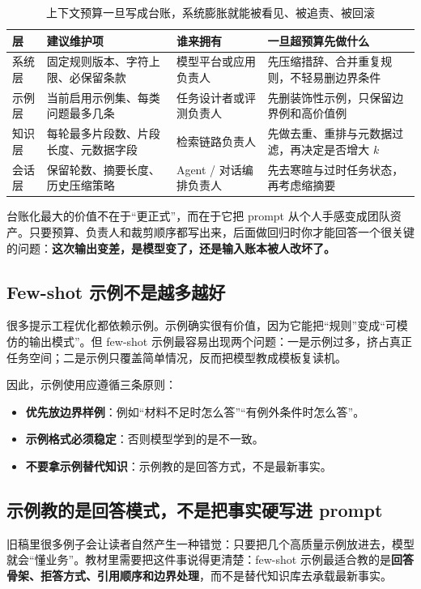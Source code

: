 \begin{table}[H]
\centering
\small
\begin{tabularx}{\textwidth}{>{\raggedright\arraybackslash}p{2.6cm}>{\raggedright\arraybackslash}p{2.5cm}>{\raggedright\arraybackslash}p{2.8cm}>{\raggedright\arraybackslash}X}
\toprule
\textbf{层} & \textbf{建议维护项} & \textbf{谁来拥有} & \textbf{一旦超预算先做什么} \\
\midrule
系统层 & 固定规则版本、字符上限、必保留条款 & 模型平台或应用负责人 & 先压缩措辞、合并重复规则，不轻易删边界条件 \\
示例层 & 当前启用示例集、每类问题最多几条 & 任务设计者或评测负责人 & 先删装饰性示例，只保留边界例和高价值例 \\
知识层 & 每轮最多片段数、片段长度、元数据字段 & 检索链路负责人 & 先做去重、重排与元数据过滤，再决定是否增大 \(k\) \\
会话层 & 保留轮数、摘要长度、历史压缩策略 & Agent / 对话编排负责人 & 先去寒暄与过时任务状态，再考虑缩摘要 \\
\bottomrule
\end{tabularx}
\caption{上下文预算一旦写成台账，系统膨胀就能被看见、被追责、被回滚}
\label{tab:context-budget-ledger}
\end{table}

台账化最大的价值不在于“更正式”，而在于它把 prompt 从个人手感变成团队资产。只要预算、负责人和裁剪顺序都写出来，后面做回归时你才能回答一个很关键的问题：\textbf{这次输出变差，是模型变了，还是输入账本被人改坏了。}

\subsection{Few-shot 示例不是越多越好}
很多提示工程优化都依赖示例。示例确实很有价值，因为它能把“规则”变成“可模仿的输出模式”。但 few-shot 示例最容易出现两个问题：一是示例过多，挤占真正任务空间；二是示例只覆盖简单情况，反而把模型教成模板复读机。

因此，示例使用应遵循三条原则：
\begin{itemize}
  \item \textbf{优先放边界样例}：例如“材料不足时怎么答”“有例外条件时怎么答”。
  \item \textbf{示例格式必须稳定}：否则模型学到的是不一致。
  \item \textbf{不要拿示例替代知识}：示例教的是回答方式，不是最新事实。
\end{itemize}

\subsection{示例教的是回答模式，不是把事实硬写进 prompt}
旧稿里很多例子会让读者自然产生一种错觉：只要把几个高质量示例放进去，模型就会“懂业务”。教材里需要把这件事说得更清楚：few-shot 示例最适合教的是\textbf{回答骨架、拒答方式、引用顺序和边界处理}，而不是替代知识库去承载最新事实。

